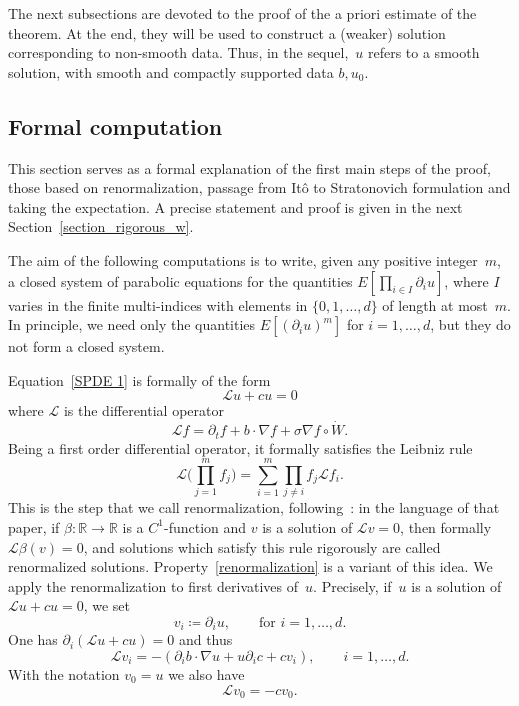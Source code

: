\documentclass[a4paper,10pt]{article}
\newcommand\1{\mathbbm{1}}
\numberwithin{equation}{section}
\begin{document}
The next subsections are devoted to the proof of the a priori estimate of the theorem. At the end, they will be used to construct a (weaker) solution
corresponding to non-smooth data. Thus, in the sequel,~$u$ refers to a smooth solution, with smooth and compactly supported data $b,u_{0}$.

\subsection{Formal computation}

This section serves as a formal explanation of the first main steps of the proof, those based on renormalization, passage from It\^{o} to Stratonovich
formulation and taking the expectation. A precise statement and proof is given in the next Section~\ref{section_rigorous_w}. 

The aim of the following computations is to write, given any positive integer~$m$, a closed system of parabolic equations for the quantities $E[ \prod_{i\in I}\partial_{i}u]$, where $I$ varies in the finite multi-indices with elements in $\{0,1,\ldots, d\}$ of length at most~$m$. In principle, we need only the quantities $E[(\partial_{i}u)^{m}]$ for $i=1,\ldots,d$, but they do not form a closed system.

Equation~\eqref{SPDE 1} is formally of the form
\begin{equation*}
\mathcal{L}u+cu=0
\end{equation*}
where $\mathcal{L}$ is the differential operator
\begin{equation*}
\mathcal{L}f=\partial_{t}f+b\cdot\nabla f+\sigma\nabla f\circ\dot{W}.
\end{equation*}
Being a first order differential operator, it formally satisfies the Leibniz rule
\begin{equation}
\mathcal{L} \Big(\prod_{j=1}^{m}f_{j}\Big)  =\sum_{i=1}^{m}\prod_{j\neq
i}f_{j}\mathcal{L}f_{i}. \label{renormalization} 
\end{equation}
This is the step that we call renormalization, following~\cite{DIPELI89}: in the language of that paper, if $\beta \colon \mathbb{R\rightarrow R}$ is a $C^{1}$-function and $v$ is a solution of $\mathcal{L}v=0$, then formally $\mathcal{L}\beta(v)=0$, and solutions which satisfy this rule rigorously are called renormalized solutions. Property~\eqref{renormalization} is a variant of this idea. We apply the renormalization to first derivatives of~$u$. Precisely, if~$u$ is a solution of $\mathcal{L}u+cu=0$, we set
\begin{equation*}
v_{i}\coloneqq \partial_{i}u,\qquad \text{for } i=1,\ldots,d.
\end{equation*}
One has $\partial_{i}(\mathcal{L}u+cu)  =0$ and thus
\begin{equation*}
\mathcal{L}v_{i}=-(\partial_{i}b\cdot\nabla u+u\partial_{i} 
c+cv_{i})  ,\qquad i=1,\ldots,d.
\end{equation*}
With the notation $v_{0}=u$ we also have 
\begin{equation*}
\mathcal{L}v_{0}=-cv_{0}.
\end{equation*}
\end{document}
